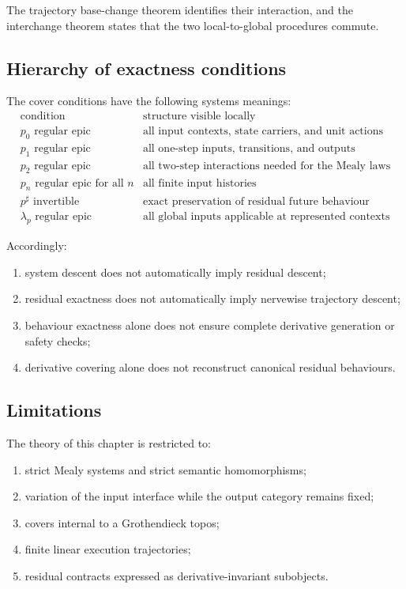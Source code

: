 The trajectory base-change theorem identifies their interaction, and the
interchange theorem states that the two local-to-global procedures commute.

\subsection{Hierarchy of exactness conditions}
\label{subsec:hierarchy-exactness-conditions}

The cover conditions have the following systems meanings:
\[
\begin{array}{c|c}
    \text{condition}
    &
    \text{structure visible locally}
    \\
    \hline
    p_0\text{ regular epic}
    &
    \text{all input contexts, state carriers, and unit actions}
    \\
    p_1\text{ regular epic}
    &
    \text{all one-step inputs, transitions, and outputs}
    \\
    p_2\text{ regular epic}
    &
    \text{all two-step interactions needed for the Mealy laws}
    \\
    p_n\text{ regular epic for all }n
    &
    \text{all finite input histories}
    \\
    p^\sharp\text{ invertible}
    &
    \text{exact preservation of residual future behaviour}
    \\
    \lambda_p\text{ regular epic}
    &
    \text{all global inputs applicable at represented contexts}
\end{array}
\]

Accordingly:
\begin{enumerate}
    \item system descent does not automatically imply residual descent;
    \item residual exactness does not automatically imply nervewise trajectory
    descent;
    \item behaviour exactness alone does not ensure complete derivative
    generation or safety checks;
    \item derivative covering alone does not reconstruct canonical residual
    behaviours.
\end{enumerate}

\subsection{Limitations}
\label{subsec:limitations-interface-descent}

The theory of this chapter is restricted to:
\begin{enumerate}
    \item strict Mealy systems and strict semantic homomorphisms;
    \item variation of the input interface while the output category remains
    fixed;
    \item covers internal to a Grothendieck topos;
    \item finite linear execution trajectories;
    \item residual contracts expressed as derivative-invariant subobjects.
\end{enumerate}

